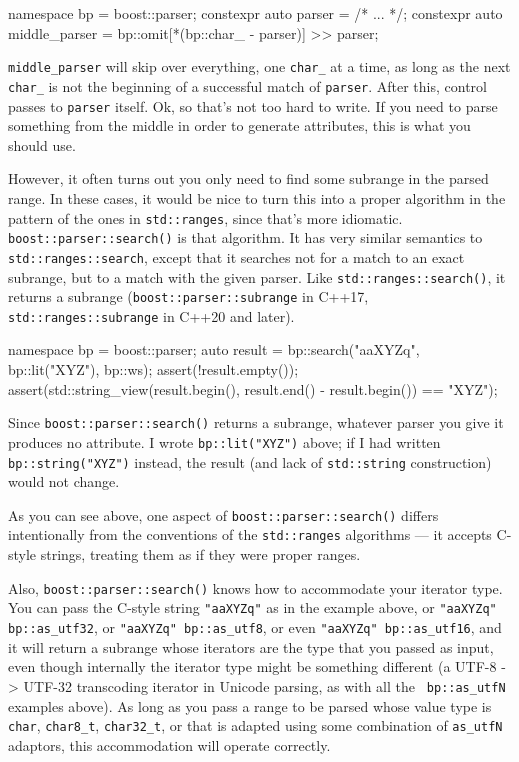 \begin{code}
namespace bp = boost::parser;
constexpr auto parser = /* ... */;
constexpr auto middle_parser = bp::omit[*(bp::char_ - parser)] >> parser;
\end{code}

\texttt{middle\_parser} will skip over everything, one \texttt{char\_} at a time, as long as the next \texttt{char\_} is not the beginning of a successful match of \texttt{parser}. After this, control passes to \texttt{parser} itself. Ok, so that's not too hard to write. If you need to parse something from the middle in order to generate attributes, this is what you should use.

However, it often turns out you only need to find some subrange in the parsed range. In these cases, it would be nice to turn this into a proper algorithm in the pattern of the ones in \texttt{std::ranges}, since that's more idiomatic. \texttt{boost::parser::search()} is that algorithm. It has very similar semantics to \texttt{std::ranges::search}, except that it searches not for a match to an exact subrange, but to a match with the given parser. Like \texttt{std::ranges::search()}, it returns a subrange (\texttt{boost::parser::subrange} in C++17, \texttt{std::ranges::subrange} in C++20 and later).

\begin{code}
namespace bp = boost::parser;
auto result = bp::search("aaXYZq", bp::lit("XYZ"), bp::ws);
assert(!result.empty());
assert(std::string_view(result.begin(), result.end() - result.begin()) == "XYZ");
\end{code}

Since \texttt{boost::parser::search()} returns a subrange, whatever parser you give it produces no attribute. I wrote \texttt{bp::lit("XYZ")} above; if I had written \texttt{bp::string("XYZ")} instead, the result (and lack of \texttt{std::string} construction) would not change.

As you can see above, one aspect of \texttt{boost::parser::search()} differs intentionally from the conventions of the \texttt{std::ranges} algorithms --- it accepts C-style strings, treating them as if they were proper ranges.

Also, \texttt{boost::parser::search()} knows how to accommodate your iterator type. You can pass the C-style string \texttt{"aaXYZq"} as in the example above, or \texttt{"aaXYZq" \textbar{} bp::as\_utf32}, or \texttt{"aaXYZq" \textbar{} bp::as\_utf8}, or even \texttt{"aaXYZq" \textbar{} bp::as\_utf16}, and it will return a subrange whose iterators are the type that you passed as input, even though internally the iterator type might be something different (a UTF-8 -> UTF-32 transcoding iterator in Unicode parsing, as with all the \texttt{\textbar{} bp::as\_utfN} examples above). As long as you pass a range to be parsed whose value type is \texttt{char}, \texttt{char8\_t}, \texttt{char32\_t}, or that is adapted using some combination of \texttt{as\_utfN} adaptors, this accommodation will operate correctly.

